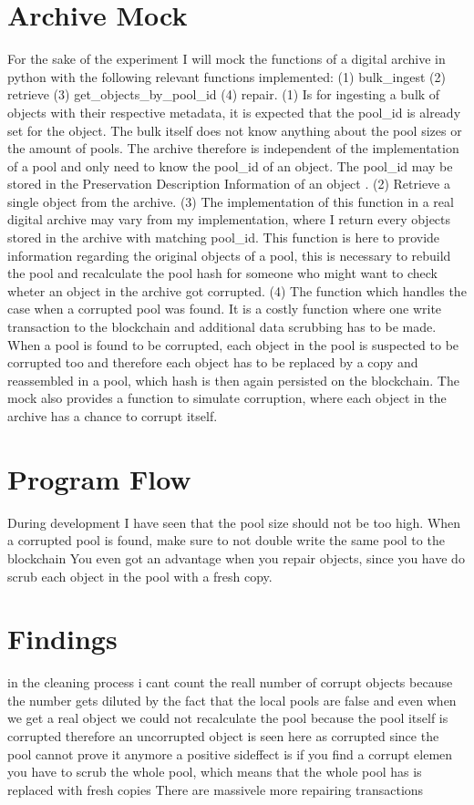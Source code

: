\section{Archive Mock}
For the sake of the experiment I will mock the functions of a digital archive in python with the following relevant functions implemented: (1) bulk_ingest (2) retrieve (3) get_objects_by_pool_id (4) repair. (1) Is for ingesting a bulk of objects with their respective metadata, it is expected that the pool_id is already set for the object. The bulk itself does not know anything about the pool sizes or the amount of pools. The archive therefore is independent of the implementation of a pool and only need to know the pool_id of an object. The pool_id may be stored in the Preservation Description Information of an object \cite{lee2010open}. (2) Retrieve a single object from the archive. (3) The implementation of this function in a real digital archive may vary from my implementation, where I return every objects stored in the archive with matching pool_id. This function is here to provide information regarding the original objects of a pool, this is necessary to rebuild the pool and recalculate the pool hash for someone who might want to check wheter an object in the archive got corrupted. (4) The function which handles the case when a corrupted pool was found. It is a costly function where one write transaction to the blockchain and additional data scrubbing has to be made. When a pool is found to be corrupted, each object in the pool is suspected to be corrupted too and therefore each object has to be replaced by a copy and reassembled in a pool, which hash is then again persisted on the blockchain.
The mock also provides a function to simulate corruption, where each object in the archive has a chance to corrupt itself.
\section{Program Flow}
During development I have seen that the pool size should not be too high.
When a corrupted pool is found, make sure to not double write the same pool to the blockchain
You even got an advantage when you repair objects, since you have do scrub each object in the pool with a fresh copy.
\section{Findings}
in the cleaning process i cant count the reall number of corrupt objects because the number gets diluted by the fact that the local pools are false and even when we get a real object we could not recalculate the pool because the pool itself is corrupted therefore an uncorrupted object is seen here as corrupted since the pool cannot prove it anymore
a positive sideffect is if you find a corrupt elemen you have to scrub the whole pool, which means that the whole pool has is replaced with fresh copies
There are massivele more repairing transactions

